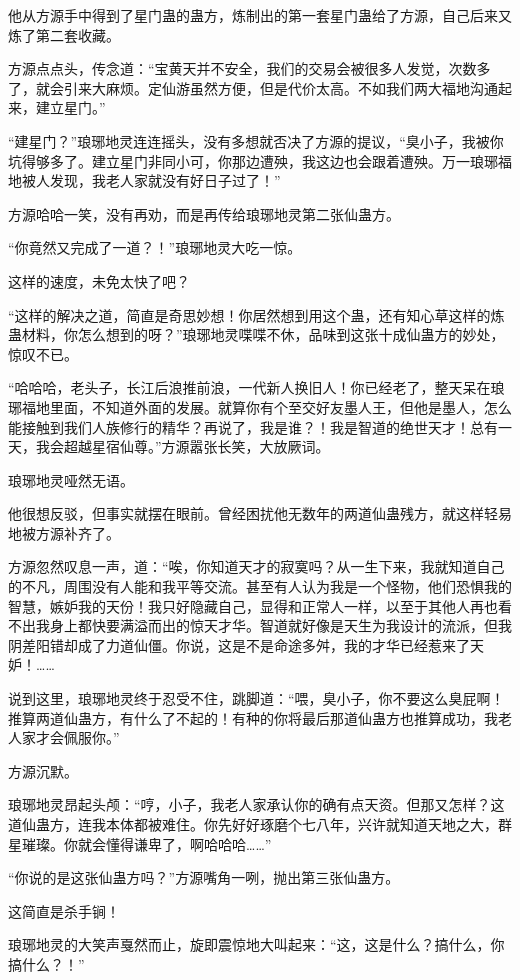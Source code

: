 \begin{this_body}
他从方源手中得到了星门蛊的蛊方，炼制出的第一套星门蛊给了方源，自己后来又炼了第二套收藏。

方源点点头，传念道：“宝黄天并不安全，我们的交易会被很多人发觉，次数多了，就会引来大麻烦。定仙游虽然方便，但是代价太高。不如我们两大福地沟通起来，建立星门。”

“建星门？”琅琊地灵连连摇头，没有多想就否决了方源的提议，“臭小子，我被你坑得够多了。建立星门非同小可，你那边遭殃，我这边也会跟着遭殃。万一琅琊福地被人发现，我老人家就没有好日子过了！”

方源哈哈一笑，没有再劝，而是再传给琅琊地灵第二张仙蛊方。

“你竟然又完成了一道？！”琅琊地灵大吃一惊。

这样的速度，未免太快了吧？

“这样的解决之道，简直是奇思妙想！你居然想到用这个蛊，还有知心草这样的炼蛊材料，你怎么想到的呀？”琅琊地灵喋喋不休，品味到这张十成仙蛊方的妙处，惊叹不已。

“哈哈哈，老头子，长江后浪推前浪，一代新人换旧人！你已经老了，整天呆在琅琊福地里面，不知道外面的发展。就算你有个至交好友墨人王，但他是墨人，怎么能接触到我们人族修行的精华？再说了，我是谁？！我是智道的绝世天才！总有一天，我会超越星宿仙尊。”方源嚣张长笑，大放厥词。

琅琊地灵哑然无语。

他很想反驳，但事实就摆在眼前。曾经困扰他无数年的两道仙蛊残方，就这样轻易地被方源补齐了。

方源忽然叹息一声，道：“唉，你知道天才的寂寞吗？从一生下来，我就知道自己的不凡，周围没有人能和我平等交流。甚至有人认为我是一个怪物，他们恐惧我的智慧，嫉妒我的天份！我只好隐藏自己，显得和正常人一样，以至于其他人再也看不出我身上都快要满溢而出的惊天才华。智道就好像是天生为我设计的流派，但我阴差阳错却成了力道仙僵。你说，这是不是命途多舛，我的才华已经惹来了天妒！……

说到这里，琅琊地灵终于忍受不住，跳脚道：“喂，臭小子，你不要这么臭屁啊！推算两道仙蛊方，有什么了不起的！有种的你将最后那道仙蛊方也推算成功，我老人家才会佩服你。”

方源沉默。

琅琊地灵昂起头颅：“哼，小子，我老人家承认你的确有点天资。但那又怎样？这道仙蛊方，连我本体都被难住。你先好好琢磨个七八年，兴许就知道天地之大，群星璀璨。你就会懂得谦卑了，啊哈哈哈……”

“你说的是这张仙蛊方吗？”方源嘴角一咧，抛出第三张仙蛊方。

这简直是杀手锏！

琅琊地灵的大笑声戛然而止，旋即震惊地大叫起来：“这，这是什么？搞什么，你搞什么？！”


\end{this_body}
